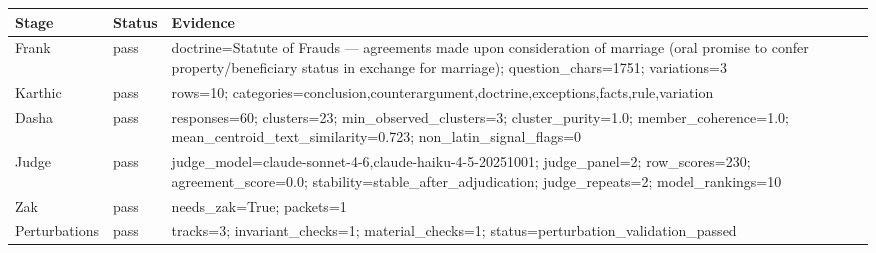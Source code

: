\begin{tabular}{lll}
\toprule
Stage & Status & Evidence \\
\midrule
Frank & pass & doctrine=Statute of Frauds — agreements made upon consideration of marriage (oral promise to confer property/beneficiary status in exchange for marriage); question\_chars=1751; variations=3 \\
Karthic & pass & rows=10; categories=conclusion,counterargument,doctrine,exceptions,facts,rule,variation \\
Dasha & pass & responses=60; clusters=23; min\_observed\_clusters=3; cluster\_purity=1.0; member\_coherence=1.0; mean\_centroid\_text\_similarity=0.723; non\_latin\_signal\_flags=0 \\
Judge & pass & judge\_model=claude-sonnet-4-6,claude-haiku-4-5-20251001; judge\_panel=2; row\_scores=230; agreement\_score=0.0; stability=stable\_after\_adjudication; judge\_repeats=2; model\_rankings=10 \\
Zak & pass & needs\_zak=True; packets=1 \\
Perturbations & pass & tracks=3; invariant\_checks=1; material\_checks=1; status=perturbation\_validation\_passed \\
\bottomrule
\end{tabular}
